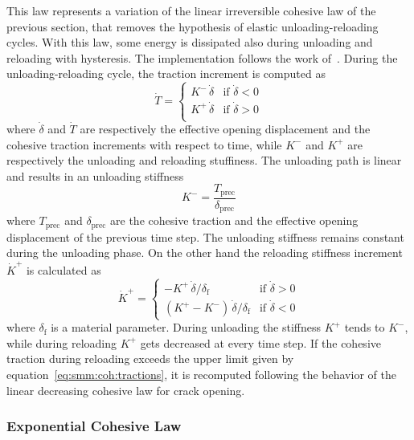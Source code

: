 This law represents a variation of the linear irreversible cohesive
law of the previous section, that removes the hypothesis of elastic
unloading-reloading cycles. With this law, some energy is dissipated
also during unloading and reloading with hysteresis. The
implementation follows the work of~\cite{nguyen2001}. During the
unloading-reloading cycle, the traction increment is computed as
\begin{equation}
  \dot{T} =
  \begin{cases}
    K^- \, \dot{\delta} & \text{if $\dot{\delta} < 0$} \\
    K^+ \, \dot{\delta} & \text{if $\dot{\delta} > 0$} \\
  \end{cases}
\end{equation}
where $\dot{\delta}$ and $\dot{T}$ are respectively the effective
opening displacement and the cohesive traction increments with respect
to time, while $K^-$ and $K^+$ are respectively the unloading and
reloading stuffiness. The unloading path is linear and results in an
unloading stiffness
\begin{equation}
  K^- = \frac{T_\mathrm{prec}}{\delta_\mathrm{prec}}
\end{equation}
where $T_\mathrm{prec}$ and $\delta_\mathrm{prec}$ are the cohesive
traction and the effective opening displacement of the previous time
step. The unloading stiffness remains constant during the unloading
phase. On the other hand the reloading stiffness increment $\dot{K}^+$
is calculated as
\begin{equation}
  \dot{K}^+ =
  \begin{cases}
    - K^+ \, \dot{\delta} / \delta_\mathrm{f} & \text{if $\dot{\delta}
      > 0$} \\
    \left( K^+ - K^- \right) \, \dot{\delta} / \delta_\mathrm{f} &
    \text{if $\dot{\delta} < 0$}
  \end{cases}
\end{equation}
where $\delta_\mathrm{f}$ is a material parameter. During unloading
the stiffness $K^+$ tends to $K^-$, while during reloading $K^+$ gets
decreased at every time step. If the cohesive traction during
reloading exceeds the upper limit given by
equation~\eqref{eq:smm:coh:tractions}, it is recomputed following the
behavior of the linear decreasing cohesive law for crack opening.

\subsubsection{Exponential Cohesive Law}

